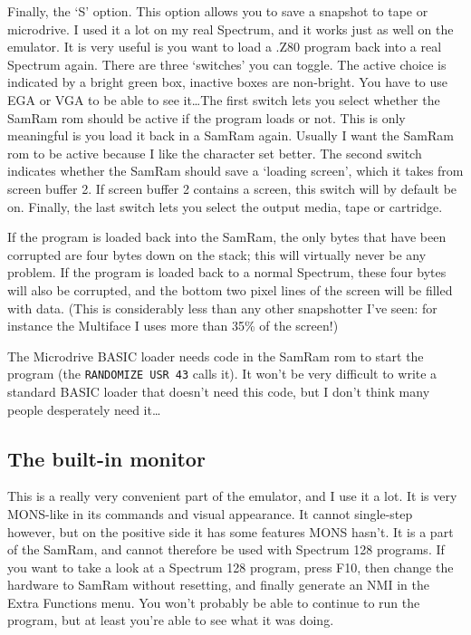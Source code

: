     Finally, the `S' option.  This option allows you to save a snapshot to
    tape or microdrive.  I used it a lot on my real Spectrum, and it works
    just as well on the emulator.  It is very useful is you want to load a
    .Z80 program back into a real Spectrum again.  There are three
    `switches' you can toggle.  The active choice is indicated by a bright
    green box, inactive boxes are non-bright.  You have to use EGA or VGA to
    be able to see it\ldots  The first switch lets you select whether the
    SamRam rom should be active if the program loads or not.  This is only
    meaningful is you load it back in a SamRam again.  Usually I want the
    SamRam rom to be active because I like the character set better.  The
    second switch indicates whether the SamRam should save a `loading
    screen', which it takes from screen buffer 2.  If screen buffer 2
    contains a screen, this switch will by default be on.  Finally, the last
    switch lets you select the output media, tape or cartridge.

    If the program is loaded back into the SamRam, the only bytes that have
    been corrupted are four bytes down on the stack; this will virtually
    never be any problem.  If the program is loaded back to a normal
    Spectrum, these four bytes will also be corrupted, and the bottom two
    pixel lines of the screen will be filled with data.  (This is
    considerably less than any other snapshotter I've seen: for instance the
    Multiface I uses more than 35\% of the screen!)

    The Microdrive BASIC loader needs code in the SamRam rom to start the
    program (the \verb|RANDOMIZE USR 43| calls it).
    It won't be very difficult to
    write a standard BASIC loader that doesn't need this code, but I don't
    think many people desperately need it\ldots



\subsection{The built-in monitor}

    This is a really very convenient part of the emulator, and I use it a
    lot.  It is very MONS-like in its commands and visual appearance.  It
    cannot single-step however, but on the positive side it has some
    features MONS hasn't.  It is a part of the SamRam, and cannot therefore
    be used with Spectrum 128 programs.  If you want to take a look at a
    Spectrum 128 program, press F10, then change the hardware to SamRam
    without resetting, and finally generate an NMI in the Extra Functions
    menu.  You won't probably be able to continue to run the program, but at
    least you're able to see what it was doing.

